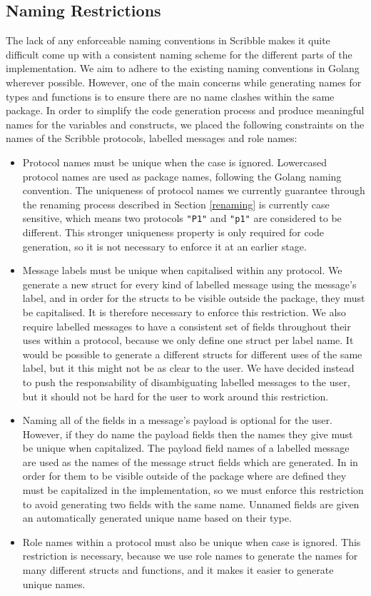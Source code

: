 \documentclass[12pt,twoside]{report}
\begin{document}
\subsection{Naming Restrictions}\label{naming-restrictions}

The lack of any enforceable naming conventions in Scribble makes it quite difficult come up with a consistent naming scheme for the different parts of the implementation. We aim to adhere to the existing naming conventions in Golang wherever possible. However, one of the main concerns while generating names for types and functions is to ensure there are no name clashes within the same package. In order to simplify the code generation process and produce meaningful names for the variables and constructs, we placed the following constraints on the names of the Scribble protocols, labelled messages and role names:

\begin{itemize}
    \item Protocol names must be unique when the case is ignored. Lowercased protocol names are used as package names, following the Golang naming convention. The uniqueness of protocol names we currently guarantee through the renaming process described in Section \ref{renaming} is currently case sensitive, which means two protocols \texttt{"P1"} and \texttt{"p1"} are considered to be different. This stronger uniqueness property is only required for code generation, so it is not necessary to enforce it at an earlier stage.
    \item Message labels must be unique when capitalised within any protocol. We generate a new struct for every kind of labelled message using the message's label, and in order for the structs to be visible outside the package, they must be capitalised. It is therefore necessary to enforce this restriction. We also require labelled messages to have a consistent set of fields throughout their uses within a protocol, because we only define one struct per label name. It would be possible to generate a different structs for different uses of the same label, but it this might not be as clear to the user. We have decided instead to push the responsability of disambiguating labelled messages to the user, but it should not be hard for the user to work around this restriction.
    \item Naming all of the fields in a message's payload is optional for the user. However, if they do name the payload fields then the names they give must be unique when capitalized. The payload field names of a labelled message are used as the names of the message struct fields which are generated. In in order for them to be visible outside of the package where are defined they must be capitalized in the implementation, so we must enforce this restriction to avoid generating two fields with the same name. Unnamed fields are given an automatically generated unique name based on their type.
    \item Role names within a protocol must also be unique when case is ignored. This restriction is necessary, because we use role names to generate the names for many different structs and functions, and it makes it easier to generate unique names.
\end{itemize}
\end{document}

